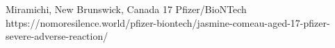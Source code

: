           {Miramichi, New Brunswick, Canada}
          {17}
          {Pfizer/BioNTech}
          {}
          {
          }
          {https://nomoresilence.world/pfizer-biontech/jasmine-comeau-aged-17-pfizer-severe-adverse-reaction/}

